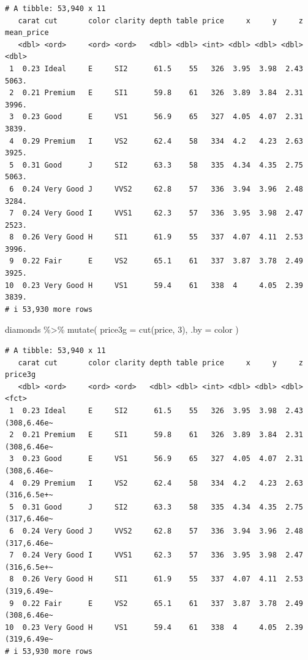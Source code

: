 \documentclass[
  letterpaper,
]{ctexbook}
\newenvironment{Shaded}{\begin{snugshade}}{\end{snugshade}}
\newcommand{\AttributeTok}[1]{\textcolor[rgb]{0.40,0.45,0.13}{#1}}
\newcommand{\DecValTok}[1]{\textcolor[rgb]{0.68,0.00,0.00}{#1}}
\newcommand{\FunctionTok}[1]{\textcolor[rgb]{0.28,0.35,0.67}{#1}}
\newcommand{\NormalTok}[1]{\textcolor[rgb]{0.00,0.23,0.31}{#1}}
\newcommand{\SpecialCharTok}[1]{\textcolor[rgb]{0.37,0.37,0.37}{#1}}
\begin{document}
\begin{verbatim}
# A tibble: 53,940 x 11
   carat cut       color clarity depth table price     x     y     z mean_price
   <dbl> <ord>     <ord> <ord>   <dbl> <dbl> <int> <dbl> <dbl> <dbl>      <dbl>
 1  0.23 Ideal     E     SI2      61.5    55   326  3.95  3.98  2.43      5063.
 2  0.21 Premium   E     SI1      59.8    61   326  3.89  3.84  2.31      3996.
 3  0.23 Good      E     VS1      56.9    65   327  4.05  4.07  2.31      3839.
 4  0.29 Premium   I     VS2      62.4    58   334  4.2   4.23  2.63      3925.
 5  0.31 Good      J     SI2      63.3    58   335  4.34  4.35  2.75      5063.
 6  0.24 Very Good J     VVS2     62.8    57   336  3.94  3.96  2.48      3284.
 7  0.24 Very Good I     VVS1     62.3    57   336  3.95  3.98  2.47      2523.
 8  0.26 Very Good H     SI1      61.9    55   337  4.07  4.11  2.53      3996.
 9  0.22 Fair      E     VS2      65.1    61   337  3.87  3.78  2.49      3925.
10  0.23 Very Good H     VS1      59.4    61   338  4     4.05  2.39      3839.
# i 53,930 more rows
\end{verbatim}

\begin{Shaded}
\begin{Highlighting}[]
\NormalTok{diamonds }\SpecialCharTok{\%\textgreater{}\%}
  \FunctionTok{mutate}\NormalTok{(}
    \AttributeTok{price3g =} \FunctionTok{cut}\NormalTok{(price, }\DecValTok{3}\NormalTok{),}
    \AttributeTok{.by =}\NormalTok{ color}
\NormalTok{  )}
\end{Highlighting}
\end{Shaded}

\begin{verbatim}
# A tibble: 53,940 x 11
   carat cut       color clarity depth table price     x     y     z price3g    
   <dbl> <ord>     <ord> <ord>   <dbl> <dbl> <int> <dbl> <dbl> <dbl> <fct>      
 1  0.23 Ideal     E     SI2      61.5    55   326  3.95  3.98  2.43 (308,6.46e~
 2  0.21 Premium   E     SI1      59.8    61   326  3.89  3.84  2.31 (308,6.46e~
 3  0.23 Good      E     VS1      56.9    65   327  4.05  4.07  2.31 (308,6.46e~
 4  0.29 Premium   I     VS2      62.4    58   334  4.2   4.23  2.63 (316,6.5e+~
 5  0.31 Good      J     SI2      63.3    58   335  4.34  4.35  2.75 (317,6.46e~
 6  0.24 Very Good J     VVS2     62.8    57   336  3.94  3.96  2.48 (317,6.46e~
 7  0.24 Very Good I     VVS1     62.3    57   336  3.95  3.98  2.47 (316,6.5e+~
 8  0.26 Very Good H     SI1      61.9    55   337  4.07  4.11  2.53 (319,6.49e~
 9  0.22 Fair      E     VS2      65.1    61   337  3.87  3.78  2.49 (308,6.46e~
10  0.23 Very Good H     VS1      59.4    61   338  4     4.05  2.39 (319,6.49e~
# i 53,930 more rows
\end{verbatim}
\end{document}
